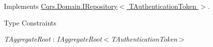 Implements \hyperlink{interfaceCqrs_1_1Domain_1_1IRepository_a6086f15a0fef4982da553d24aee04015}{Cqrs.\+Domain.\+I\+Repository$<$ T\+Authentication\+Token $>$}.

\begin{Desc}
\item[Type Constraints]\begin{description}
\item[{\em T\+Aggregate\+Root} : {\em I\+Aggregate\+Root$<$T\+Authentication\+Token$>$}]\end{description}
\end{Desc}
